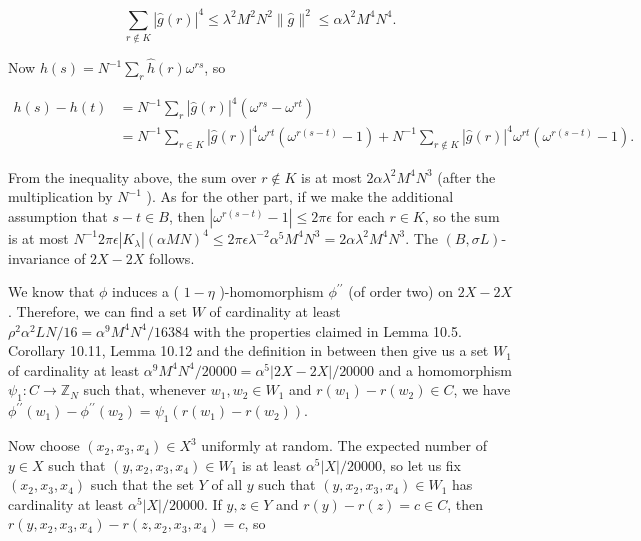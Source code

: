 \documentclass[10pt]{article}
\begin{document}
$$
\sum_{r \notin K}|\hat{g}(r)|^{4} \leqslant \lambda^{2} M^{2} N^{2}\|\hat{g}\|^{2} \leqslant \alpha \lambda^{2} M^{4} N^{4} .
$$

Now $h(s)=N^{-1} \sum_{r} \hat{h}(r) \omega^{r s}$, so

$$
\begin{aligned}
h(s)-h(t) & =N^{-1} \sum_{r}|\hat{g}(r)|^{4}\left(\omega^{r s}-\omega^{r t}\right) \\
& =N^{-1} \sum_{r \in K}|\hat{g}(r)|^{4} \omega^{r t}\left(\omega^{r(s-t)}-1\right)+N^{-1} \sum_{r \notin K}|\hat{g}(r)|^{4} \omega^{r t}\left(\omega^{r(s-t)}-1\right) .
\end{aligned}
$$

From the inequality above, the sum over $r \notin K$ is at most $2 \alpha \lambda^{2} M^{4} N^{3}$ (after the multiplication by $N^{-1}$ ). As for the other part, if we make the additional assumption that $s-t \in B$, then $\left|\omega^{r(s-t)}-1\right| \leqslant 2 \pi \epsilon$ for each $r \in K$, so the sum is at most $N^{-1} 2 \pi \epsilon\left|K_{\lambda}\right|(\alpha M N)^{4} \leqslant 2 \pi \epsilon \lambda^{-2} \alpha^{5} M^{4} N^{3}=2 \alpha \lambda^{2} M^{4} N^{3}$. The $(B, \sigma L)$-invariance of $2 X-2 X$ follows.

We know that $\phi$ induces a ( $1-\eta$ )-homomorphism $\phi^{\prime \prime}$ (of order two) on $2 X-2 X$. Therefore, we can find a set $W$ of cardinality at least $\rho^{2} \alpha^{2} L N / 16=\alpha^{9} M^{4} N^{4} / 16384$ with the properties claimed in Lemma 10.5. Corollary 10.11, Lemma 10.12 and the definition in between then give us a set $W_{1}$ of cardinality at least $\alpha^{9} M^{4} N^{4} / 20000=\alpha^{5}|2 X-2 X| / 20000$ and a homomorphism $\psi_{1}: C \rightarrow \mathbb{Z}_{N}$ such that, whenever $w_{1}, w_{2} \in W_{1}$ and $r\left(w_{1}\right)-r\left(w_{2}\right) \in C$, we have $\phi^{\prime \prime}\left(w_{1}\right)-\phi^{\prime \prime}\left(w_{2}\right)=\psi_{1}\left(r(w_{1})-r(w_{2})\right)$.

Now choose $\left(x_{2}, x_{3}, x_{4}\right) \in X^{3}$ uniformly at random. The expected number of $y \in X$ such that $\left(y, x_{2}, x_{3}, x_{4}\right) \in W_1$ is at least $\alpha^{5}|X| / 20000$, so let us fix $\left(x_{2}, x_{3}, x_{4}\right)$ such that the set $Y$ of all $y$ such that $\left(y, x_{2}, x_{3}, x_{4}\right) \in W_1$ has cardinality at least $\alpha^{5}|X| / 20000$. If $y, z \in Y$ and $r(y)-r(z)=c \in C$, then $r\left(y, x_{2}, x_{3}, x_{4}\right)-r\left(z, x_{2}, x_{3}, x_{4}\right)=c$, so
\end{document}
